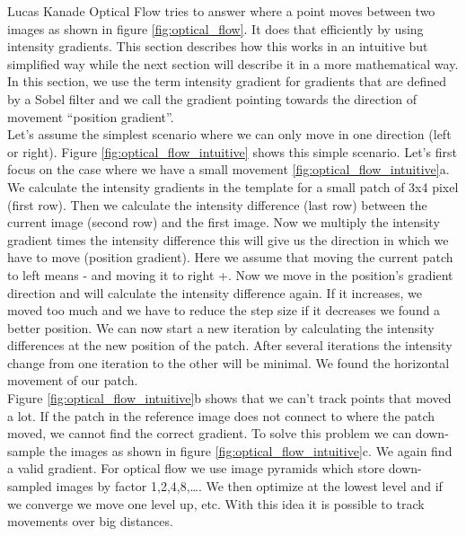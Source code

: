 \documentclass[11pt,a4paper,titlepage,oneside]{report}
\begin{document}
Lucas Kanade Optical Flow tries to answer where a point moves between two images as shown in figure \ref{fig:optical_flow}. It does that efficiently by using intensity gradients. This section describes how this works in an intuitive but simplified way while the next section will describe it in a more mathematical way. In this section, we use the term intensity gradient for gradients that are defined by a Sobel filter and we call the gradient pointing towards the direction of movement ``position gradient''.\\
Let's assume the simplest scenario where we can only move in one direction (left or right). Figure \ref{fig:optical_flow_intuitive} shows this simple scenario. Let's first focus on the case where we have a small movement \ref{fig:optical_flow_intuitive}a. We calculate the intensity gradients in the template for a small patch of 3x4 pixel (first row). Then we calculate the intensity difference (last row) between the current image (second row) and the first image. Now we multiply the intensity gradient times the intensity difference this will give us the direction in which we have to move (position gradient). Here we assume that moving the current patch to left means - and moving it to right +. Now we move in the position's gradient direction and will calculate the intensity difference again. If it increases, we moved too much and we have to reduce the step size if it decreases we found a better position. We can now start a new iteration by calculating the intensity differences at the new position of the patch. After several iterations the intensity change from one iteration to the other will be minimal. We found the horizontal movement of our patch.\\
Figure \ref{fig:optical_flow_intuitive}b shows that we can't track points that moved a lot. If the patch in the reference image does not connect to where the patch moved, we cannot find the correct gradient. To solve this problem we can down-sample the images as shown in figure \ref{fig:optical_flow_intuitive}c. We again find a valid gradient. For optical flow we use image pyramids \cite{rvc} which store down-sampled images by factor 1,2,4,8,\dots. We then optimize at the lowest level and if we converge we move one level up, etc. With this idea it is possible to track movements over big distances.
\end{document}
